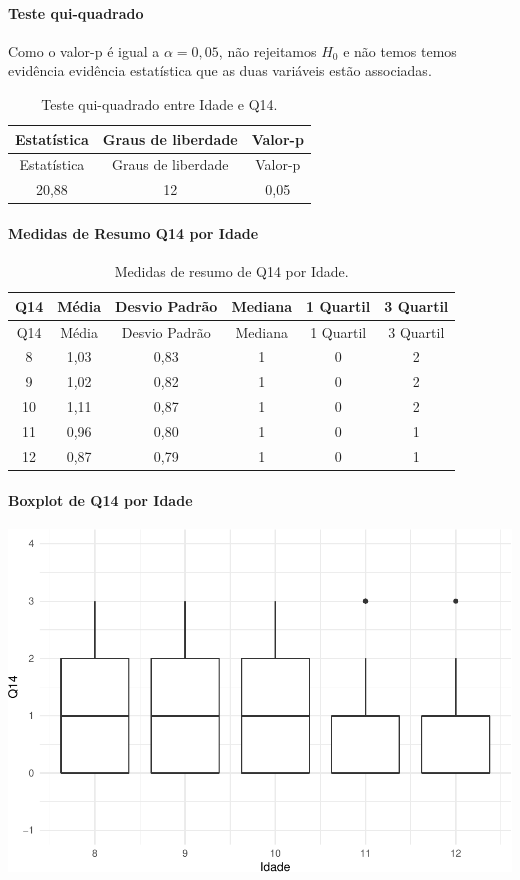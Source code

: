 \documentclass[]{article}
\let\oldparagraph\paragraph
\renewcommand{\paragraph}[1]{\oldparagraph{#1}\mbox{}}
\begin{document}
\hypertarget{teste-qui-quadrado-4}{%
\paragraph{Teste qui-quadrado}\label{teste-qui-quadrado-4}}

Como o valor-p é igual a \(\alpha=0,05\), não rejeitamos \(H_0\) e não temos temos evidência evidência estatística que as duas variáveis estão associadas.

\begin{longtable}[]{@{}ccc@{}}
\caption{\label{tab:unnamed-chunk-76}Teste qui-quadrado entre Idade e Q14.}\tabularnewline
\toprule
Estatística & Graus de liberdade & Valor-p\tabularnewline
\midrule
\endfirsthead
\toprule
Estatística & Graus de liberdade & Valor-p\tabularnewline
\midrule
\endhead
20,88 & 12 & 0,05\tabularnewline
\bottomrule
\end{longtable}

\cleardoublepage

\hypertarget{medidas-de-resumo-q14-por-idade}{%
\paragraph{Medidas de Resumo Q14 por Idade}\label{medidas-de-resumo-q14-por-idade}}

\begin{longtable}[]{@{}cccccc@{}}
\caption{\label{tab:unnamed-chunk-77}Medidas de resumo de Q14 por Idade.}\tabularnewline
\toprule
Q14 & Média & Desvio Padrão & Mediana & 1 Quartil & 3 Quartil\tabularnewline
\midrule
\endfirsthead
\toprule
Q14 & Média & Desvio Padrão & Mediana & 1 Quartil & 3 Quartil\tabularnewline
\midrule
\endhead
8 & 1,03 & 0,83 & 1 & 0 & 2\tabularnewline
9 & 1,02 & 0,82 & 1 & 0 & 2\tabularnewline
10 & 1,11 & 0,87 & 1 & 0 & 2\tabularnewline
11 & 0,96 & 0,80 & 1 & 0 & 1\tabularnewline
12 & 0,87 & 0,79 & 1 & 0 & 1\tabularnewline
\bottomrule
\end{longtable}

\hypertarget{boxplot-de-q14-por-idade}{%
\paragraph{Boxplot de Q14 por Idade}\label{boxplot-de-q14-por-idade}}

\begin{center}\includegraphics[width=0.75\linewidth]{relatorio_files/figure-latex/unnamed-chunk-78-1} \end{center}
\end{document}
